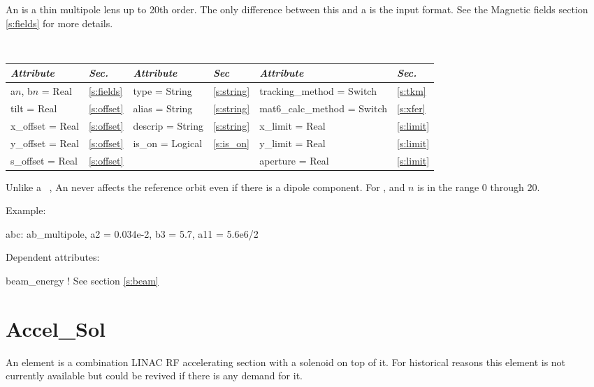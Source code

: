 An  is a thin multipole lens up to 20th order. The only
difference between this and a  is the input format. See the 
Magnetic fields section \ref{s:fields} for more details.

\toffset
\begin{center}
\tt 
\begin{tabular}{|l|l||l|l||l|l|} \hline
  {\sl Attribute} & {\sl Sec.}  & {\sl Attribute} & {\sl Sec} & {\sl Attribute} & {\sl Sec.} \\ \hline
  a$n$, b$n$ = Real  &  \ref{s:fields} &  type = String    & \ref{s:string} & tracking\_method = Switch    & \ref{s:tkm}   \\ \hline
  tilt       = Real  &  \ref{s:offset} &  alias = String   & \ref{s:string} & mat6\_calc\_method = Switch  & \ref{s:xfer}  \\ \hline
  x\_offset  = Real  &  \ref{s:offset} &  descrip = String & \ref{s:string} & x\_limit = Real              & \ref{s:limit} \\ \hline
  y\_offset  = Real  &  \ref{s:offset} &  is\_on = Logical & \ref{s:is_on}  & y\_limit = Real              & \ref{s:limit} \\ \hline
  s\_offset  = Real  &  \ref{s:offset} &                   &                & aperture = Real              & \ref{s:limit} \\ \hline
\end{tabular}
\end{center}
\toffset

Unlike a \mad\ , An  never affects the
reference orbit even if there is a dipole component. For ,
and  $n$ is in the range 0 through 20.

\vskip0.05in \noindent
Example:
\begin{example}
  abc: ab_multipole, a2 = 0.034e-2, b3 = 5.7, a11 = 5.6e6/2
\end{example}

\vskip0.05in \noindent
Dependent attributes:
\begin{example}
  beam\_energy  ! See section \ref{s:beam}
\end{example}

\section{Accel\_Sol}
\label{s:accel_sol}

An  element is a combination LINAC RF accelerating
section with a solenoid on top of it. For historical reasons this
element is not currently available but could be revived if there is
any demand for it.

